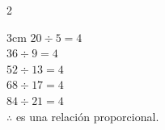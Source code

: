\begin{multicols}{2}
\begin{parts}
                \begin{solutionbox}{3cm}
                    $20\div  5=4$\\[-0.2em]
                    $36\div  9=4$\\[-0.2em]
                    $52\div 13=4$\\[-0.2em]
                    $68\div 17=4$\\[-0.2em]
                    $84\div 21=4$\\[-0.2em]
                    $\therefore$ es una relación proporcional.
                \end{solutionbox}

            \end{parts}
        \end{multicols}
    